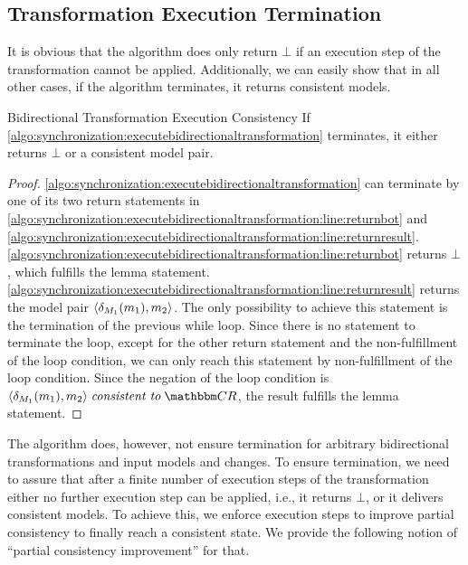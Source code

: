 \subsection{Transformation Execution Termination}

It is obvious that the algorithm does only return $\bot$ if an execution step of the transformation cannot be applied.
Additionally, we can easily show that in all other cases, if the algorithm terminates, it returns consistent models.

\begin{lemma}{Bidirectional Transformation Execution Consistency}
    \label{lemma:bidirectionaltransformationconsistency}
    If \autoref{algo:synchronization:executebidirectionaltransformation} terminates, it either returns $\bot$ or a consistent model pair.
\end{lemma}
\begin{proof}
    \autoref{algo:synchronization:executebidirectionaltransformation} can terminate by one of its two return statements in \autoref{algo:synchronization:executebidirectionaltransformation:line:returnbot} and \autoref{algo:synchronization:executebidirectionaltransformation:line:returnresult}.
    \autoref{algo:synchronization:executebidirectionaltransformation:line:returnbot} returns $\bot$, which fulfills the lemma statement.
    \autoref{algo:synchronization:executebidirectionaltransformation:line:returnresult} returns the model pair $\langle \delta_{M_{1}}(m_{1}), m_{2} \rangle$.
    The only possibility to achieve this statement is the termination of the previous while loop.
    Since there is no statement to terminate the loop, except for the other return statement and the non-fulfillment of the loop condition, we can only reach this statement by non-fulfillment of the loop condition.
    Since the negation of the loop condition is $\tupled{\change{\metamodel{M}{1}}(\model{m}{1}), \model{m}{2}} \consistenttomath \consistencyrelationset{CR}$, the result fulfills the lemma statement.
\end{proof}

The algorithm does, however, not ensure termination for arbitrary bidirectional transformations and input models and changes.
To ensure termination, we need to assure that after a finite number of execution steps of the transformation either no further execution step can be applied, i.e., it returns $\bot$, or it delivers consistent models.
To achieve this, we enforce execution steps to improve partial consistency to finally reach a consistent state. 
We provide the following notion of \enquote{partial consistency improvement} for that.

